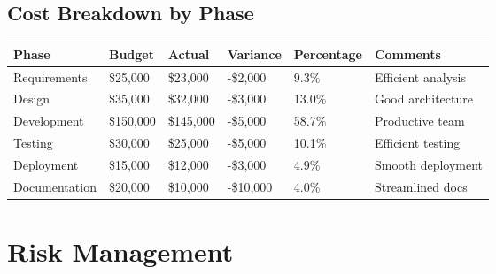 \documentclass[12pt,a4paper]{article}
\begin{document}
\subsection{Cost Breakdown by Phase}
\begin{longtable}{|p{3cm}|p{2cm}|p{2cm}|p{2cm}|p{2cm}|p{3cm}|}
\hline
\rowcolor{lightgray}
\textbf{Phase} & \textbf{Budget} & \textbf{Actual} & \textbf{Variance} & \textbf{Percentage} & \textbf{Comments} \\
\hline
Requirements & \$25,000 & \$23,000 & -\$2,000 & 9.3\% & Efficient analysis \\
\hline
Design & \$35,000 & \$32,000 & -\$3,000 & 13.0\% & Good architecture \\
\hline
Development & \$150,000 & \$145,000 & -\$5,000 & 58.7\% & Productive team \\
\hline
Testing & \$30,000 & \$25,000 & -\$5,000 & 10.1\% & Efficient testing \\
\hline
Deployment & \$15,000 & \$12,000 & -\$3,000 & 4.9\% & Smooth deployment \\
\hline
Documentation & \$20,000 & \$10,000 & -\$10,000 & 4.0\% & Streamlined docs \\
\hline
\end{longtable}

\section{Risk Management}
\end{document}
